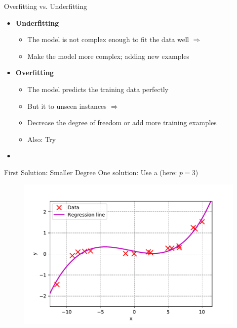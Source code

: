 \begin{frame}{Overfitting vs. Underfitting}{}
	\begin{itemize}
		\item \textbf{Underfitting}
		\begin{itemize}
			\item The model is not complex enough to fit the data well $\Rightarrow$ 
			\item Make the model more complex; adding new examples 
		\end{itemize}
		\item \textbf{Overfitting}
		\begin{itemize}
			\item The model predicts the training data perfectly
			\item But it  to unseen instances $\Rightarrow$ 
			\item Decrease the degree of freedom or add more training examples
			\item Also: Try 
		\end{itemize}
		\item {}
	\end{itemize}
\end{frame}


\begin{frame}{First Solution: Smaller Degree}{}
	\vspace*{3mm}
	One solution: Use a  (here: $p = 3$)
	\vspace{-3mm}
	\begin{figure}
		\includegraphics[scale=0.5]{05_regression/02_img/non_linear_data_with_poly_fit_degree_3}
	\end{figure}
\end{frame}


